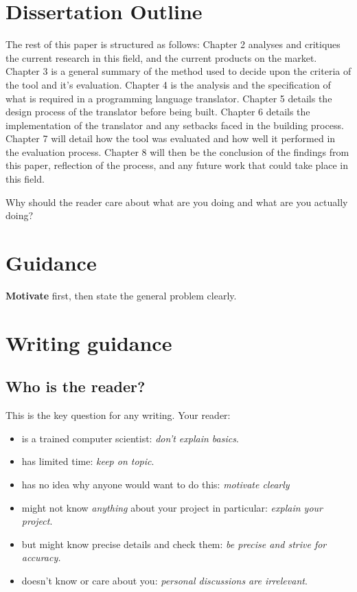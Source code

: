 \documentclass{l4proj}
\begin{document}
\section{Dissertation Outline}
The rest of this paper is structured as follows:
Chapter 2 analyses and critiques the current research in this field, and the current products on the market.
Chapter 3 is a general summary of the method used to decide upon the criteria of the tool and it's evaluation.
Chapter 4 is the analysis and the specification of what is required in a programming language translator.
Chapter 5 details the design process of the translator before being built.
Chapter 6 details the implementation of the translator and any setbacks faced in the building process.
Chapter 7 will detail how the tool was evaluated and how well it performed in the evaluation process.
Chapter 8 will then be the conclusion of the findings from this paper, reflection of the process,  and any future work that could take place in this field.








Why should the reader care about what are you doing and what are you actually doing?
\section{Guidance}

\textbf{Motivate} first, then state the general problem clearly. 

\section{Writing guidance}
\subsection{Who is the reader?}

This is the key question for any writing. Your reader:

\begin{itemize}
    \item
    is a trained computer scientist: \emph{don't explain basics}.
    \item
    has limited time: \emph{keep on topic}.
    \item
    has no idea why anyone would want to do this: \emph{motivate clearly}
    \item
    might not know \emph{anything} about your project in particular:
    \emph{explain your project}.
    \item
    but might know precise details and check them: \emph{be precise and
    strive for accuracy.}
    \item
    doesn't know or care about you: \emph{personal discussions are
    irrelevant}.
\end{itemize}
\end{document}
